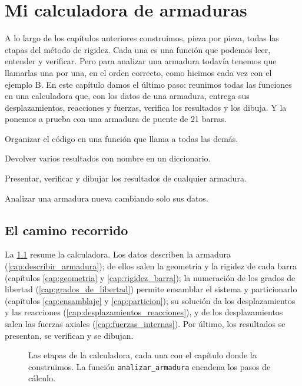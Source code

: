 \chapter{Mi calculadora de armaduras}\label{cap:mi_calculadora}

A lo largo de los capítulos anteriores construimos, pieza por pieza, todas las
etapas del método de rigidez. Cada una es una función que podemos leer,
entender y verificar. Pero para analizar una armadura todavía tenemos que
llamarlas una por una, en el orden correcto, como hicimos cada vez con el
ejemplo B. En este capítulo damos el último paso: reunimos todas las
funciones en una calculadora que, con los datos de una armadura, entrega sus
desplazamientos, reacciones y fuerzas, verifica los resultados y los dibuja.
Y la ponemos a prueba con una armadura de puente de 21 barras.

\begin{objetivos}
  \item Organizar el código en una función que llama a todas las demás.
  \item Devolver varios resultados con nombre en un diccionario.
  \item Presentar, verificar y dibujar los resultados de cualquier armadura.
  \item Analizar una armadura nueva cambiando solo sus datos.
\end{objetivos}

\section{El camino recorrido}\label{sec:camino}

La \cref{fig:flujo_calculadora} resume la calculadora. Los datos describen
la armadura (\cref{cap:describir_armadura}); de ellos salen la geometría y la
rigidez de cada barra (capítulos \ref{cap:geometria} y
\ref{cap:rigidez_barra}); la numeración de los grados de libertad
(\cref{cap:grados_de_libertad}) permite ensamblar el sistema y particionarlo
(capítulos \ref{cap:ensamblaje} y \ref{cap:particion}); su solución da los
desplazamientos y las reacciones (\cref{cap:desplazamientos_reacciones}), y
de los desplazamientos salen las fuerzas axiales
(\cref{cap:fuerzas_internas}). Por último, los resultados se presentan, se
verifican y se dibujan.

\begin{figure}[ht]
  \centering
  \caption{Las etapas de la calculadora, cada una con el capítulo donde la
    construimos. La función \texttt{analizar\_armadura} encadena los pasos
    de cálculo.}
  \label{fig:flujo_calculadora}
\end{figure}

